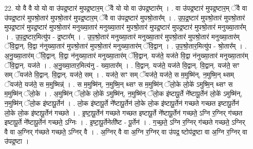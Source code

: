 \documentclass[17pt]{extarticle}
\begin{document}
22. यो वै वै यो यो वा उ॑पद्र॒ष्टार॑ मुपद्र॒ष्टार॒म् ॅवै यो यो वा उ॑पद्र॒ष्टार᳚म् । . वा उ॑पद्र॒ष्टार॑ मुपद्र॒ष्टार॒म् ॅवै वा उ॑पद्र॒ष्टार॑ मुपश्रो॒तार॑ मुपश्रो॒तार॑ मुपद्र॒ष्टार॒म् ॅवै वा उ॑पद्र॒ष्टार॑ मुपश्रो॒तार᳚म् । . उ॒प॒द्र॒ष्टार॑ मुपश्रो॒तार॑ मुपश्रो॒तार॑ मुपद्र॒ष्टार॑ मुपद्र॒ष्टार॑ मुपश्रो॒तार॑ मनुख्या॒तार॑ मनुख्या॒तार॑ मुपश्रो॒तार॑ मुपद्र॒ष्टार॑ मुपद्र॒ष्टार॑ मुपश्रो॒तार॑ मनुख्या॒तार᳚म् । . उ॒प॒द्र॒ष्टार॒मित्यु॑प - द्र॒ष्टार᳚म् । . उ॒प॒श्रो॒तार॑ मनुख्या॒तार॑ मनुख्या॒तार॑ मुपश्रो॒तार॑ मुपश्रो॒तार॑ मनुख्या॒तार॑म् ॅवि॒द्वान्. वि॒द्वा न॑नुख्या॒तार॑ मुपश्रो॒तार॑ मुपश्रो॒तार॑ मनुख्या॒तार॑म् ॅवि॒द्वान् । . उ॒प॒श्रो॒तार॒मित्यु॑प - श्रो॒तार᳚म् । . अ॒नु॒ख्या॒तार॑म् ॅवि॒द्वान्. वि॒द्वा न॑नुख्या॒तार॑ मनुख्या॒तार॑म् ॅवि॒द्वान्. यज॑ते॒ यज॑ते वि॒द्वा न॑नुख्या॒तार॑ मनुख्या॒तार॑म् ॅवि॒द्वान्. यज॑ते । . अ॒नु॒ख्या॒तार॒मित्य॑नु - ख्या॒तार᳚म् । . वि॒द्वान्. यज॑ते॒ यज॑ते वि॒द्वान्. वि॒द्वान्. यज॑ते॒ सꣳ सम् ॅयज॑ते वि॒द्वान्. वि॒द्वान्. यज॑ते॒ सम् । . यज॑ते॒ सꣳ सम् ॅयज॑ते॒ यज॑ते॒ स म॒मुष्मि॑न्, न॒मुष्मि॒न् थ्सम् ॅयज॑ते॒ यज॑ते॒ स म॒मुष्मिन्न्॑ । . स म॒मुष्मि॑न्, न॒मुष्मि॒न् थ्सꣳ स म॒मुष्मि॑न् ॅलो॒के लो॒के॑ ऽमुष्मि॒न् थ्सꣳ स म॒मुष्मि॑न् ॅलो॒के । . अ॒मुष्मि॑न् ॅलो॒के लो॒के॑ ऽमुष्मि॑न्, न॒मुष्मि॑न् ॅलो॒क इ॑ष्टापू॒र्ते ने᳚ष्टापू॒र्तेन॑ लो॒के॑ ऽमुष्मि॑न्, न॒मुष्मि॑न् ॅलो॒क इ॑ष्टापू॒र्तेन॑ । . लो॒क इ॑ष्टापू॒र्ते ने᳚ष्टापू॒र्तेन॑ लो॒के लो॒क इ॑ष्टापू॒र्तेन॑ गच्छते गच्छत इष्टापू॒र्तेन॑ लो॒के लो॒क इ॑ष्टापू॒र्तेन॑ गच्छते । . इ॒ष्टा॒पू॒र्तेन॑ गच्छते गच्छत इष्टापू॒र्ते ने᳚ष्टापू॒र्तेन॑ गच्छते॒ ऽग्नि र॒ग्निर् ग॑च्छत 
इष्टापू॒र्ते ने᳚ष्टापू॒र्तेन॑ गच्छते॒ ऽग्निः । . इ॒ष्टा॒पू॒र्तेनेती᳚ष्ट - पू॒र्तेन॑ । . ग॒च्छ॒ते॒ ऽग्नि र॒ग्निर् ग॑च्छते गच्छते॒ ऽग्निर् वै वा अ॒ग्निर् ग॑च्छते गच्छते॒ ऽग्निर् वै । . अ॒ग्निर् वै वा अ॒ग्नि र॒ग्निर् वा उ॑पद्र॒ ष्टोप॑द्र॒ष्टा वा अ॒ग्नि र॒ग्निर् वा उ॑पद्र॒ष्टा । \newline
\end{document}
